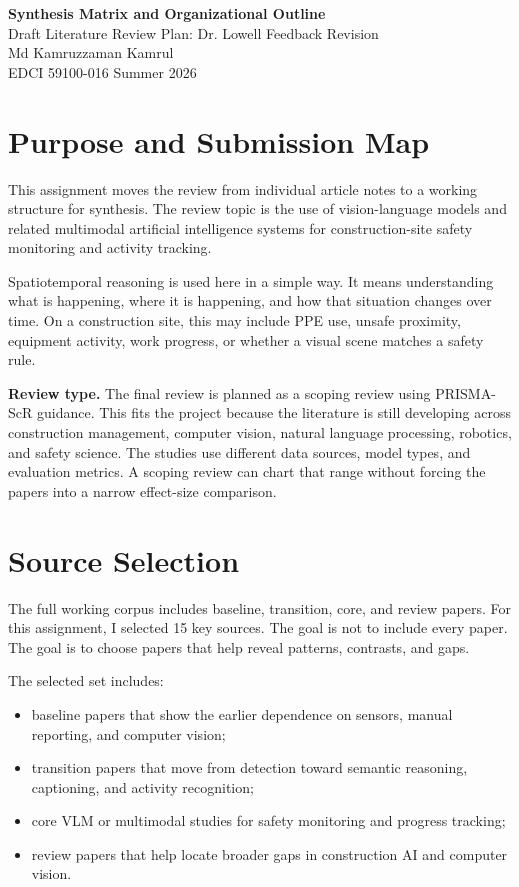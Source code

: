 \documentclass[10pt, letterpaper]{article}
\begin{document}
\begin{center}
{\Large\bfseries Synthesis Matrix and Organizational Outline}\\[0.35em]
{\normalsize Draft Literature Review Plan: Dr. Lowell Feedback Revision}\\[0.25em]
{\normalsize Md Kamruzzaman Kamrul}\\
{\normalsize EDCI 59100-016 \textbar{} Summer 2026}
\end{center}

\vspace{0.6em}

\section{Purpose and Submission Map}

This assignment moves the review from individual article notes to a working structure for synthesis. The review topic is the use of vision-language models and related multimodal artificial intelligence systems for construction-site safety monitoring and activity tracking.

Spatiotemporal reasoning is used here in a simple way. It means understanding what is happening, where it is happening, and how that situation changes over time. On a construction site, this may include PPE use, unsafe proximity, equipment activity, work progress, or whether a visual scene matches a safety rule.

\textbf{Review type.} The final review is planned as a scoping review using PRISMA-ScR guidance. This fits the project because the literature is still developing across construction management, computer vision, natural language processing, robotics, and safety science. The studies use different data sources, model types, and evaluation metrics. A scoping review can chart that range without forcing the papers into a narrow effect-size comparison.

\section{Source Selection}

The full working corpus includes baseline, transition, core, and review papers. For this assignment, I selected 15 key sources. The goal is not to include every paper. The goal is to choose papers that help reveal patterns, contrasts, and gaps.

The selected set includes:

\begin{itemize}
\item baseline papers that show the earlier dependence on sensors, manual reporting, and computer vision;
\item transition papers that move from detection toward semantic reasoning, captioning, and activity recognition;
\item core VLM or multimodal studies for safety monitoring and progress tracking;
\item review papers that help locate broader gaps in construction AI and computer vision.
\end{itemize}
\end{document}
